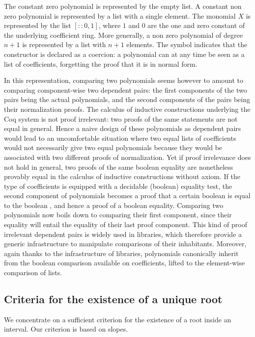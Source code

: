 \documentclass{mscs}
\begin{document}
The constant zero polynomial is represented by the empty list. A
constant non zero polynomial is represented by a list with a single
element. The monomial $X$ is represented
by the list $[:: 0, 1]$, where $1$ and $0$ are the one and zero
constant of the underlying coefficient ring.
More generally, a non zero polynomial of degree $n+1$ is
represented by a list with $n+1$ elements. The \C{:>} symbol indicates
that the  constructor is declared as a coercion: a
polynomial can at any time be seen as a list of coefficients,
forgetting the proof that it is in normal form.

In this representation, comparing two polynomials seems however to
amount to comparing component-wise two dependent pairs: the first
components of
the two pairs being the actual polynomials, and the second components
of the pairs being their normalization proofs. The calculus of
inductive constructions underlying the Coq system is not proof
irrelevant: two proofs of the same statements are not equal in
general. Hence a naive design of these polynomials as dependent pairs
would lead to an uncomfortable situation where two equal lists of
coefficients would not necessarily give two equal polynomials because
they would be associated with two different proofs of normalization. Yet if
proof irrelevance does not hold in general, two proofs of the same
boolean equality are nonetheless provably equal in the calculus of
inductive constructions without axiom.
If the type  of coefficients is equipped with a decidable
(boolean) equality test, the second component of polynomials becomes a
proof that a certain boolean is equal to the boolean , and
hence a proof of a boolean equality. Comparing two polynomials now
boils down to comparing their first component, since their equality
will entail the equality of their last proof component. This
kind of proof irrelevant dependent pairs is widely used in \ssr{}
libraries, which therefore provide a generic infrastructure to
manipulate comparisons of their inhabitants. Moreover, again thanks
to the infrastructure of \ssr{} libraries, polynomials
canonically inherit from the boolean comparison available on
coefficients, lifted to the element-wise comparison of lists.



\subsection{Criteria for the existence of a unique root}
\label{sec:criteria}
We concentrate on a sufficient criterion for the existence of a root
inside an interval.  %
Our criterion is based on slopes.
\end{document}
